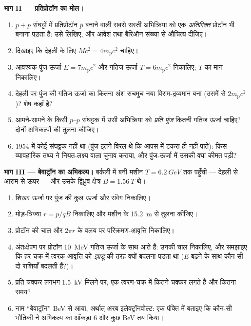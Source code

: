 \begin{problem}[{सप्ताहांत समस्या --- संवेग-संरक्षण ने प्रतिसंसार का
मोल कैसे तय किया}]
\medskip\noindent\textbf{भाग II --- प्रतिप्रोटॉन का मोल।}
\begin{enumerate}[resume]
  \item $p + p$ संघट्टों में प्रतिप्रोटॉन $\bar p$ बनाने वाली सबसे
        सस्ती अभिक्रिया को एक \emph{अतिरिक्त} प्रोटॉन भी बनाना पड़ता
        है: उसे लिखिए, और आवेश तथा बैरिऑन संख्या से औचित्य दीजिए।
  \item दिखाइए कि देहली के लिए $Mc^2 = 4m_{\text{p}}c^2$ चाहिए।
  \item आवश्यक पुंज-ऊर्जा $E = 7m_{\text{p}}c^2$ और गतिज ऊर्जा
        $T = 6m_{\text{p}}c^2$ निकालिए; $T$ का मान निकालिए।
  \item देहली पर पुंज की गतिज ऊर्जा का कितना अंश सचमुच नया
        विराम-द्रव्यमान बना (उसमें से $2m_{\text{p}}c^2$)?
        शेष कहाँ है?
  \item आमने-सामने के किसी $p$--$p$ संघट्टक में उसी अभिक्रिया को
        \emph{प्रति पुंज} कितनी गतिज ऊर्जा चाहिए? दोनों अभिकल्पों की
        तुलना कीजिए।
  \item 1954 में कोई संघट्टक नहीं था (पुंज इतने विरल थे कि आपस में
        टकरा ही नहीं पाते): किस व्यावहारिक तथ्य ने नियत-लक्ष्य वाला
        चुनाव कराया, और पुंज-ऊर्जा में उसकी क्या कीमत पड़ी?
\end{enumerate}

\medskip\noindent\textbf{भाग III --- बेवाट्रॉन का अभिकल्प।}
बर्कली में बनी मशीन $T = \qty{6.2}{GeV}$ तक पहुँची ---
देहली से आराम से ऊपर --- और उसके द्विध्रुव-क्षेत्र $B =
\qty{1.56}{T}$ थे।
\begin{enumerate}[resume]
  \item शिखर ऊर्जा पर पुंज की कुल ऊर्जा और संवेग निकालिए।
  \item मोड़-त्रिज्या $r = p/qB$ निकालिए और मशीन के \qty{15.2}{m} से
        तुलना कीजिए।
  \item प्रोटॉन की चाल और $2\pi r$ के वलय पर परिक्रमण-आवृत्ति
        निकालिए।
  \item अंतःक्षेपण पर प्रोटॉन \qty{10}{MeV} गतिज ऊर्जा के साथ आते
        हैं: उनकी चाल निकालिए, और समझाइए कि हर चक्र में त्वरक-आवृत्ति
        को \emph{झाड़ू} की तरह क्यों बदलना पड़ता था ($E$ बढ़ने के साथ
        कौन-सी दो राशियाँ बदलती हैं?)।
  \item प्रति चक्कर लगभग \qty{1.5}{kV} मिलने पर, एक त्वरण-चक्र में
        कितने चक्कर लगते हैं और कितना समय?
  \item नाम ``बेवाट्रॉन'' BeV से आया, अर्थात् अरब इलेक्ट्रॉनवोल्ट:
        एक पंक्ति में बताइए कि कौन-सी भौतिकी ने अभिकल्प का आँकड़ा
        $6$ और कुछ BeV तय किया।
\end{enumerate}


\end{problem}
